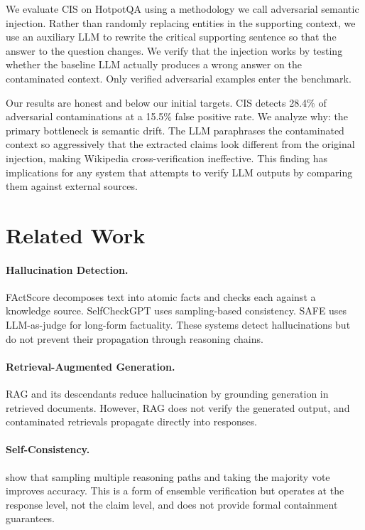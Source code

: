 \documentclass[11pt,a4paper]{article}
\begin{document}
We evaluate CIS on HotpotQA \citep{yang2018hotpotqa} using a methodology we call adversarial semantic injection. Rather than randomly replacing entities in the supporting context, we use an auxiliary LLM to rewrite the critical supporting sentence so that the answer to the question changes. We verify that the injection works by testing whether the baseline LLM actually produces a wrong answer on the contaminated context. Only verified adversarial examples enter the benchmark.

Our results are honest and below our initial targets. CIS detects 28.4\% of adversarial contaminations at a 15.5\% false positive rate. We analyze why: the primary bottleneck is semantic drift. The LLM paraphrases the contaminated context so aggressively that the extracted claims look different from the original injection, making Wikipedia cross-verification ineffective. This finding has implications for any system that attempts to verify LLM outputs by comparing them against external sources.

\section{Related Work}

\paragraph{Hallucination Detection.} FActScore \citep{min2023factscore} decomposes text into atomic facts and checks each against a knowledge source. SelfCheckGPT \citep{manakul2023selfcheckgpt} uses sampling-based consistency. SAFE \citep{wei2024longform} uses LLM-as-judge for long-form factuality. These systems detect hallucinations but do not prevent their propagation through reasoning chains.

\paragraph{Retrieval-Augmented Generation.} RAG \citep{lewis2020retrieval} and its descendants \citep{gao2023retrieval} reduce hallucination by grounding generation in retrieved documents. However, RAG does not verify the generated output, and contaminated retrievals propagate directly into responses.

\paragraph{Self-Consistency.} \citet{wang2023selfconsistency} show that sampling multiple reasoning paths and taking the majority vote improves accuracy. This is a form of ensemble verification but operates at the response level, not the claim level, and does not provide formal containment guarantees.
\end{document}
